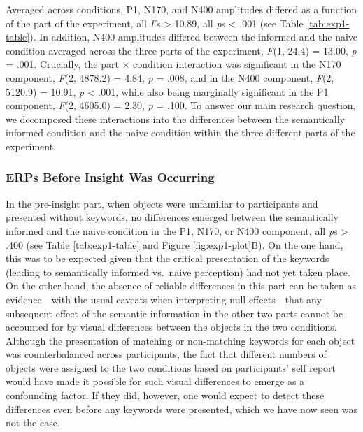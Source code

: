 \documentclass[
  english,
  doc,12pt,twoside,floatsintext]{apa7}
\begin{document}
Averaged across conditions, P1, N170, and N400 amplitudes differed as a function of the part of the experiment, all \emph{F}s \textgreater{} 10.89, all \emph{p}s \textless{} .001 (see Table \ref{tab:exp1-table}). In addition, N400 amplitudes differed between the informed and the naive condition averaged across the three parts of the experiment, \emph{F}(1, 24.4) = 13.00, \emph{p} = .001. Crucially, the part × condition interaction was significant in the N170 component, \emph{F}(2, 4878.2) = 4.84, \emph{p} = .008, and in the N400 component, \emph{F}(2, 5120.9) = 10.91, \emph{p} \textless{} .001, while also being marginally significant in the P1 component, \emph{F}(2, 4605.0) = 2.30, \emph{p} = .100. To answer our main research question, we decomposed these interactions into the differences between the semantically informed condition and the naive condition within the three different parts of the experiment.

\hypertarget{erps-before-insight-was-occurring}{%
\subsubsection{ERPs Before Insight Was Occurring}\label{erps-before-insight-was-occurring}}

In the pre-insight part, when objects were unfamiliar to participants and presented without keywords, no differences emerged between the semantically informed and the naive condition in the P1, N170, or N400 component, all \emph{p}s \textgreater{} .400 (see Table \ref{tab:exp1-table} and Figure \ref{fig:exp1-plot}B). On the one hand, this was to be expected given that the critical presentation of the keywords (leading to semantically informed vs.~naive perception) had not yet taken place. On the other hand, the absence of reliable differences in this part can be taken as evidence---with the usual caveats when interpreting null effects---that any subsequent effect of the semantic information in the other two parts cannot be accounted for by visual differences between the objects in the two conditions. Although the presentation of matching or non-matching keywords for each object was counterbalanced across participants, the fact that different numbers of objects were assigned to the two conditions based on participants' self report would have made it possible for such visual differences to emerge as a confounding factor. If they did, however, one would expect to detect these differences even before any keywords were presented, which we have now seen was not the case.
\end{document}
